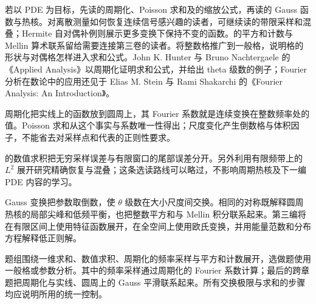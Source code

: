 \ProseParagraphBreak

若以 PDE 为目标，先读的周期化、Poisson 求和及的缩放公式，再读的 Gauss 函数与热核。对离散测量如何恢复连续信号感兴趣的读者，可继续读的带限采样和混叠；Hermite 自对偶补例则展示更多变换下保持不变的函数。的平方和计数与 Mellin 算术联系留给需要连接第三卷的读者。将整数格推广到一般格，说明格的形状与对偶格怎样进入求和公式。John K. Hunter 与 Bruno Nachtergaele 的《Applied Analysis》\cite[Section 11.11, p. 319]{Hunter2001Applied}以周期化证明求和公式，并给出 theta 级数的例子；Fourier 分析在数论中的应用还见于 Elias M. Stein 与 Rami Shakarchi 的《Fourier Analysis: An Introduction》\cite{Stein2003Fourier}。






\begin{chaptersummary}
周期化把实线上的函数放到圆周上，其 Fourier 系数就是连续变换在整数频率处的值。Poisson 求和从这个事实与系数唯一性得出；尺度变化产生倒数格与体积因子，不能省去对采样点和代表的正则性要求。

\ProseParagraphBreak

的数值求积把无穷采样误差与有限窗口的尾部误差分开。另外利用有限频带上的 \(L^2\) 展开研究精确恢复与混叠；这条选读路线可以略过，不影响周期热核及下一编 PDE 内容的学习。

\ProseParagraphBreak

Gauss 变换把参数取倒数，使 \(\theta\) 级数在大小尺度间交换。相同的对称既解释圆周热核的局部尖峰和低频平衡，也把整数平方和与 Mellin 积分联系起来。第三编将在有限区间上使用特征函数展开，在全空间上使用欧氏变换，并用能量范数和分布方程解释低正则解。
\end{chaptersummary}

\BookExercises

题组围绕一维求和、数值求积、周期化的频率采样与平方和计数展开，选做题使用一般格或参数分析。其中的频率采样通过周期化的 Fourier 系数计算；最后的跨章题把周期化与实线、圆周上的 Gauss 平滑联系起来。所有交换极限与求和的步骤均应说明所用的统一控制。

